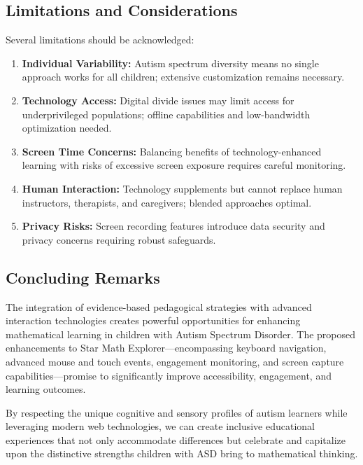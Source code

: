 \documentclass[12pt, a4paper]{article}
\begin{document}
\subsection{Limitations and Considerations}

Several limitations should be acknowledged:

\begin{enumerate}[leftmargin=*]
    \item \textbf{Individual Variability:} Autism spectrum diversity means no single approach works for all children; extensive customization remains necessary.
    
    \item \textbf{Technology Access:} Digital divide issues may limit access for underprivileged populations; offline capabilities and low-bandwidth optimization needed.
    
    \item \textbf{Screen Time Concerns:} Balancing benefits of technology-enhanced learning with risks of excessive screen exposure requires careful monitoring.
    
    \item \textbf{Human Interaction:} Technology supplements but cannot replace human instructors, therapists, and caregivers; blended approaches optimal.
    
    \item \textbf{Privacy Risks:} Screen recording features introduce data security and privacy concerns requiring robust safeguards.
\end{enumerate}

\subsection{Concluding Remarks}

The integration of evidence-based pedagogical strategies with advanced interaction technologies creates powerful opportunities for enhancing mathematical learning in children with Autism Spectrum Disorder. The proposed enhancements to Star Math Explorer—encompassing keyboard navigation, advanced mouse and touch events, engagement monitoring, and screen capture capabilities—promise to significantly improve accessibility, engagement, and learning outcomes.

By respecting the unique cognitive and sensory profiles of autism learners while leveraging modern web technologies, we can create inclusive educational experiences that not only accommodate differences but celebrate and capitalize upon the distinctive strengths children with ASD bring to mathematical thinking.
\end{document}
